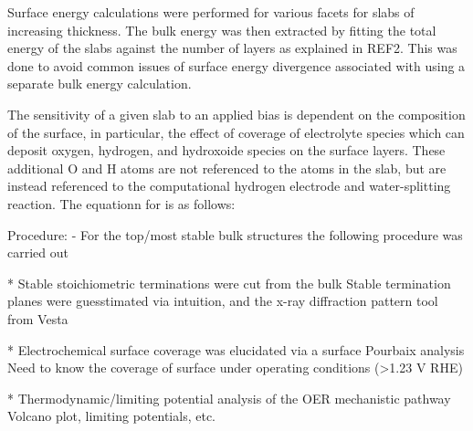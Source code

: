 Surface energy calculations were performed for various facets for slabs of increasing thickness.
The bulk energy was then extracted by fitting the total energy of the slabs against the number of layers as explained in REF2.
This was  done to avoid common issues of surface energy divergence associated with using a separate bulk energy calculation.

The sensitivity of a given slab to an applied bias is dependent on the composition of the surface,
in particular, the effect of coverage of electrolyte species which can deposit oxygen, hydrogen, and hydroxoide species on the surface layers.
These additional O and H atoms are not referenced to the atoms in the slab, but are instead referenced to the computational hydrogen electrode and water-splitting reaction.
The equationn for is as follows:






Procedure:
- For the top/most stable bulk structures the following procedure was carried out

* Stable stoichiometric terminations were cut from the bulk Stable termination planes were guesstimated via intuition, and the x-ray diffraction pattern tool from Vesta

* Electrochemical surface coverage was elucidated via a surface Pourbaix analysis Need to know the coverage of surface under operating conditions (>1.23 V RHE)

* Thermodynamic/limiting potential analysis of the OER mechanistic pathway Volcano plot, limiting potentials, etc.

